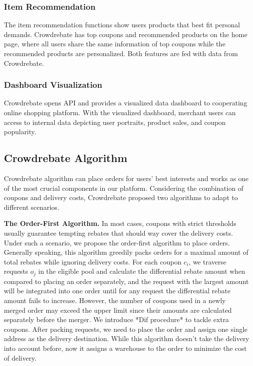\subsubsection{Item Recommendation}

The item recommendation functions show users products that best fit personal demands. Crowdrebate has top coupons and recommended products on the home page, where all users share the same information of top coupons while the recommended products are personalized. Both features are fed with data from Crowdrebate.

\subsubsection{Dashboard Visualization}

Crowdrebate opens API and provides a visualized data dashboard to cooperating online shopping platform. With the visualized dashboard, merchant users can access to internal data depicting user portraits, product sales, and coupon popularity.

\subsection{Crowdrebate Algorithm}

Crowdrebate algorithm can place orders for users' best interests and works as one of the most crucial components in our platform. Considering the combination of coupons and delivery costs, Crowdrebate proposed two algorithms to adapt to different scenarios.

\textbf{The Order-First Algorithm.} In most cases, coupons with strict thresholds usually guarantee tempting rebates that should way cover the delivery costs. Under such a scenario, we propose the order-first algorithm to place orders. Generally speaking, this algorithm greedily packs orders for a maximal amount of total rebates while ignoring delivery costs. For each coupon $c_i$, we traverse requests $o_j$ in the eligible pool and calculate the differential rebate amount when compared to placing an order separately, and the request with the largest amount will be integrated into one order until for any request the differential rebate amount fails to increase. However, the number of coupons used in a newly merged order may exceed the upper limit since their amounts are calculated separately before the merger. We introduce *Dif procedure* to tackle extra coupons. After packing requests, we need to place the order and assign one single address as the delivery destination. While this algorithm doesn't take the delivery into account before, now it assigns a warehouse to the order to minimize the cost of delivery.

